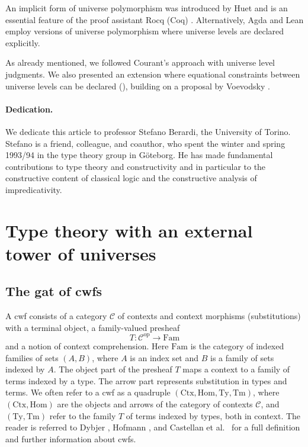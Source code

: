 \documentclass[submission,copyright,creativecommons]{eptcs}
\newcommand{\Ctx}{\mathrm{Ctx}}
\newcommand{\Sub}{\mathrm{Hom}}
\newcommand{\Ty}{\mathrm{Ty}}
\newcommand{\Tm}{\mathrm{Tm}}
\newcommand{\op}{\mathrm{op}}
\def\Fam{\mathrm{Fam}}
\def\C{\mathcal{C}}
\begin{document}
An implicit form of universe polymorphism was introduced by Huet \cite{Huet87} and is an essential feature of the proof assistant Rocq (Coq) \cite{rocq:general}. Alternatively, Agda \cite{agda-wiki} and Lean \cite{moura:lean} employ versions of universe polymorphism where universe levels are declared explicitly.

As already mentioned, we followed Courant's approach \cite{Courant02} with universe level judgments. We also presented an extension where equational constraints between universe levels can be declared (\cite[Section 5]{BezemCDE22}), building on a proposal by Voevodsky \cite{VV}. %


\paragraph{Dedication.} We dedicate this article to professor Stefano Berardi, the University of Torino. Stefano is a friend, colleague, and coauthor, who spent the winter and spring 1993/94 in the type theory group in Göteborg. He has made fundamental contributions to type theory and constructivity and in particular to the constructive content of classical logic and the constructive analysis of impredicativity.

\section{Type theory with an external tower of universes}\label{sigmaext}

\subsection{The gat of cwfs} A cwf consists of a category $\C$ of contexts and context morphisms (substitutions) with a terminal object, a family-valued presheaf
$$
T : \C^\op \to \Fam
$$
and a notion of context comprehension. Here $\Fam$ is the category of indexed families of sets $(A,B)$, where $A$ is an index set and $B$ is a family of sets indexed by $A$. The object part of the presheaf $T$ maps a context to a family of terms indexed by a type. The arrow part represents substitution in types and terms. We often refer to a cwf as a quadruple $(\Ctx,\Sub,\Ty,\Tm)$, where $(\Ctx,\Sub)$ are the objects and arrows of the category of contexts $\C$, and $(\Ty,\Tm)$ refer to the family $T$ of terms indexed by types, both in context. The reader is referred to Dybjer \cite{dybjer:torino}, Hofmann \cite{hofmann:cambridge}, and Castellan et al.\ \cite{castellan:lambek} for a full definition and further information about cwfs.
\end{document}
